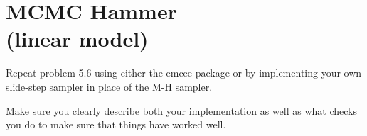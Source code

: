 \section{MCMC Hammer \\(linear model)}
Repeat problem 5.6 using either the
emcee package or by implementing your own slide-step sampler in place of the M-H sampler.

Make sure you clearly describe both your implementation as well as what checks you do to
make sure that things have worked well.

